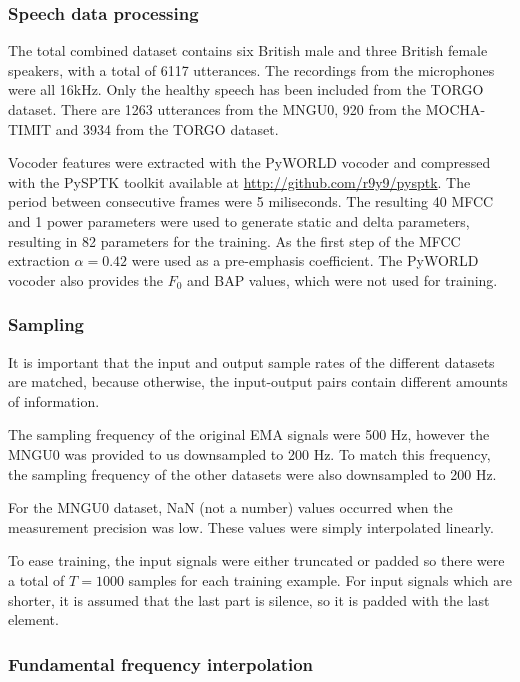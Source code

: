 \documentclass[a4paper]{article}
\begin{document}
\subsubsection{Speech data processing}

The total combined dataset contains six British male and three British female speakers, with a total
of 6117 utterances. The recordings from the microphones were all 16kHz. Only the healthy speech has been included from the TORGO dataset. There are 1263 utterances from the MNGU0, 920 from the MOCHA-TIMIT and 3934 from the TORGO dataset.

Vocoder features were extracted with the PyWORLD vocoder \cite{Morise2016}
and compressed with the PySPTK toolkit available at \url{http://github.com/r9y9/pysptk}.
The period between consecutive frames were 5 miliseconds. The resulting 40 MFCC
and 1 power parameters were used to generate static and delta parameters,
resulting in 82 parameters for the training. As the first step of the MFCC extraction \( \alpha
= 0.42 \) were used as a pre-emphasis coefficient. The PyWORLD vocoder
also provides the $ F_0 $ and BAP values, which were not used for training. 

\subsubsection{Sampling}

It is important that the input and output sample rates of the different
datasets are matched, because otherwise, the input-output pairs contain
different amounts of information.  

The sampling frequency of the original EMA signals were 500 Hz, however
the MNGU0 was provided to us downsampled to 200 Hz. To match this frequency,
the sampling frequency of the other datasets were also downsampled to 200 Hz.

For the MNGU0 dataset, NaN (not a number) values occurred when the measurement precision
was low. These values were simply interpolated linearly. 

To ease training, the input signals were either truncated or padded
so there were a total of \( T = 1000 \) samples for each training example.
For input signals which are shorter, it is assumed that the last part is
silence, so it is padded with the last element. 

\subsubsection{Fundamental frequency interpolation}
\end{document}
